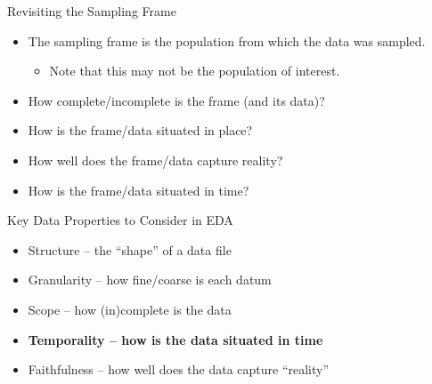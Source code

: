 \documentclass[aspectratio=169]{../latex_main/tntbeamer}  %
\begin{document}
	
	
	\begin{frame}{Revisiting the Sampling Frame}
	    \begin{itemize}
	        \item The sampling frame is the population from which the data was sampled.
	        \begin{itemize}
	            \item Note that this may not be the population of interest.
	        \end{itemize}
	        \item How complete/incomplete is the frame (and its data)? 
	        \item How is the frame/data situated in place?
	        \item How well does the frame/data capture reality?
	        \item How is the frame/data situated in time? 
	    \end{itemize}
	\end{frame}
	
	
	\begin{frame}{Key Data Properties to Consider in EDA}
	    \begin{itemize}
	        \item Structure -- the “shape” of a data file
	        \item Granularity -- how fine/coarse is each datum
	        \item Scope -- how (in)complete is the data
	        \item \textbf{Temporality -- how is the data situated in time}
	        \item Faithfulness -- how well does the data capture “reality”
	    \end{itemize}
	\end{frame}
	
	
	
\end{document}
